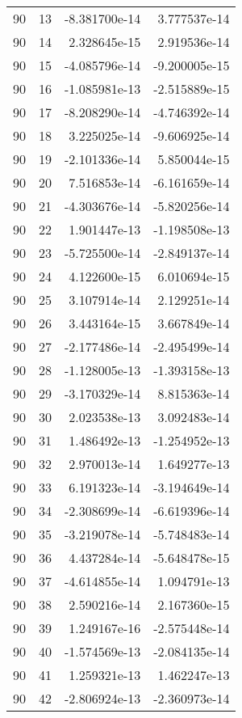 \begin{tabular}{rrrr}
  90 &   13 & -8.381700e-14 &  3.777537e-14 \\
  90 &   14 &  2.328645e-15 &  2.919536e-14 \\
  90 &   15 & -4.085796e-14 & -9.200005e-15 \\
  90 &   16 & -1.085981e-13 & -2.515889e-15 \\
  90 &   17 & -8.208290e-14 & -4.746392e-14 \\
  90 &   18 &  3.225025e-14 & -9.606925e-14 \\
  90 &   19 & -2.101336e-14 &  5.850044e-15 \\
  90 &   20 &  7.516853e-14 & -6.161659e-14 \\
  90 &   21 & -4.303676e-14 & -5.820256e-14 \\
  90 &   22 &  1.901447e-13 & -1.198508e-13 \\
  90 &   23 & -5.725500e-14 & -2.849137e-14 \\
  90 &   24 &  4.122600e-15 &  6.010694e-15 \\
  90 &   25 &  3.107914e-14 &  2.129251e-14 \\
  90 &   26 &  3.443164e-15 &  3.667849e-14 \\
  90 &   27 & -2.177486e-14 & -2.495499e-14 \\
  90 &   28 & -1.128005e-13 & -1.393158e-13 \\
  90 &   29 & -3.170329e-14 &  8.815363e-14 \\
  90 &   30 &  2.023538e-13 &  3.092483e-14 \\
  90 &   31 &  1.486492e-13 & -1.254952e-13 \\
  90 &   32 &  2.970013e-14 &  1.649277e-13 \\
  90 &   33 &  6.191323e-14 & -3.194649e-14 \\
  90 &   34 & -2.308699e-14 & -6.619396e-14 \\
  90 &   35 & -3.219078e-14 & -5.748483e-14 \\
  90 &   36 &  4.437284e-14 & -5.648478e-15 \\
  90 &   37 & -4.614855e-14 &  1.094791e-13 \\
  90 &   38 &  2.590216e-14 &  2.167360e-15 \\
  90 &   39 &  1.249167e-16 & -2.575448e-14 \\
  90 &   40 & -1.574569e-13 & -2.084135e-14 \\
  90 &   41 &  1.259321e-13 &  1.462247e-13 \\
  90 &   42 & -2.806924e-13 & -2.360973e-14 \\

\end{tabular}
